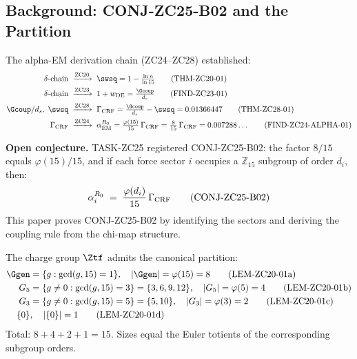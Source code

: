\documentclass[12pt, a4paper]{article}
\begin{document}
\tableofcontents
\newpage

\subsection{Background: CONJ-ZC25-B02 and the Partition}
\label{zc29:sec:background}

\begin{formalbox}[title={Inherited Context after TASK-ZC28}]
The alpha-EM derivation chain (ZC24--ZC28) established:
\begin{align}
  \delta\text{-chain}
  &\;\xrightarrow{\rm ZC20}\;
  \swsq = 1 - \tfrac{\ln n}{\ln 15}
  \tag{THM-ZC20-01}\\
  \delta\text{-chain}
  &\;\xrightarrow{\rm ZC23}\;
  1 + w_{\rm DE} = \tfrac{\Gcoup}{d_s}
  \tag{FIND-ZC23-01}\\
  \Gcoup/d_s,\;\swsq
  &\;\xrightarrow{\rm ZC28}\;
  \Gamma_{\rm CRF}
    = \tfrac{\Gcoup}{d_s} - \swsq = 0.01366447
  \tag{THM-ZC28-01}\\
  \Gamma_{\rm CRF}
  &\;\xrightarrow{\rm ZC24}\;
  \alpha_{\rm EM}^{R_0}
    = \tfrac{\varphi(15)}{15}\,\Gamma_{\rm CRF}
    = \tfrac{8}{15}\,\Gamma_{\rm CRF}
    = 0.007288\ldots
  \tag{FIND-ZC24-ALPHA-01}
\end{align}

\medskip
\textbf{Open conjecture.}
TASK-ZC25 registered CONJ-ZC25-B02: the factor $8/15$ equals
$\varphi(15)/15$, and if each force sector $i$ occupies a
$\mathbb{Z}_{15}$ subgroup of order $d_i$, then:
\[
  \alpha_i^{R_0}
  \;=\; \frac{\varphi(d_i)}{15}\,\Gamma_{\rm CRF}
  \tag{CONJ-ZC25-B02}
\]
This paper proves CONJ-ZC25-B02 by identifying the sectors
and deriving the coupling rule from the chi-map structure.
\end{formalbox}

\begin{formalbox}[title={$\mathbb{Z}_{15}$ Partition (LEM-ZC20-01 recalled)}]
\label{zc29:box:partition}
The charge group $\Ztf$ admits the canonical partition:
\begin{align}
  \Ggen &= \{g : \gcd(g,15)=1\},
    \quad |\Ggen| = \varphi(15) = 8
    \tag{LEM-ZC20-01a}\\
  G_5 &= \{g \neq 0 : \gcd(g,15)=3\} = \{3,6,9,12\},
    \quad |G_5| = \varphi(5) = 4
    \tag{LEM-ZC20-01b}\\
  G_3 &= \{g \neq 0 : \gcd(g,15)=5\} = \{5,10\},
    \quad |G_3| = \varphi(3) = 2
    \tag{LEM-ZC20-01c}\\
  \{0\} &,
    \quad |\{0\}| = 1
    \tag{LEM-ZC20-01d}
\end{align}
Total: $8 + 4 + 2 + 1 = 15$.
Sizes equal the Euler totients of the corresponding subgroup orders.
\end{formalbox}
\end{document}
